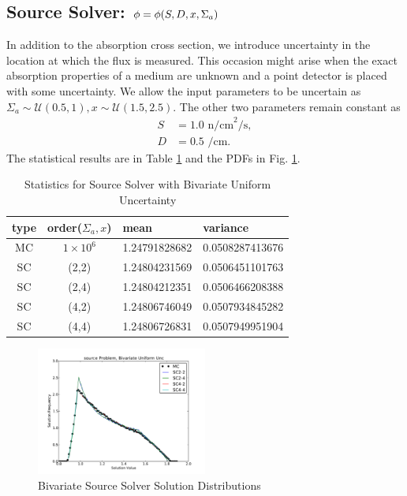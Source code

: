 \subsection{Source Solver: $\phi=\phi\qty(S,D,x,\Sigma_a)$}
In addition to the absorption cross section, we introduce uncertainty in the location at which the flux is measured.  This occasion might arise when the exact absorption properties of a medium are unknown and a point detector is placed with some uncertainty.  We allow the input parameters to be uncertain as $\Sigma_a\sim\mathcal{U}(0.5,1),x\sim\mathcal{U}(1.5,2.5)$.  The other two parameters remain constant as
\begin{align}
S &= 1.0 \text{ n/cm}^2\text{/s},\\
D &= 0.5 \text{ /cm}.
\end{align}
The statistical results are in Table \ref{tab: source mult res} and the PDFs in Fig. \ref{fig: source mult res}.
\begin{table}[H]
\begin{center}
\begin{tabular}{c c|l l}
type & order($\Sigma_a,x$) & mean & variance \\ \hline
MC & $1\times10^6$ & 1.24791828682 & 0.0508287413676\\
SC & (2,2) & 1.24804231569 & 0.0506451101763 \\
SC & (2,4) & 1.24804212351 & 0.0506466208388\\
SC & (4,2) & 1.24806746049 & 0.0507934845282\\
SC & (4,4) & 1.24806726831 & 0.0507949951904 \\
\end{tabular}
\end{center}
\caption{Statistics for Source Solver with Bivariate Uniform Uncertainty}
\label{tab: source mult res}
\end{table}
\begin{figure}[h]
\centering
   \includegraphics[width=0.5\textwidth]{../graphics/source_2v_uniform_pdfs}
\caption{Bivariate Source Solver Solution Distributions}
\label{fig: source mult res}
\end{figure}

